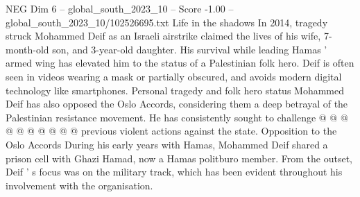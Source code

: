 \begin{textsample}{NEG Dim 6 – global\_south\_2023\_10 – Score -1.00 – global\_south\_2023\_10/102526695.txt}
Life in the shadows In 2014, tragedy struck Mohammed Deif as an Israeli airstrike claimed the lives of his wife, 7-month-old son, and 3-year-old daughter.
His survival while leading Hamas ' armed wing has elevated him to the status of a Palestinian folk hero.
Deif is often seen in videos wearing a mask or partially obscured, and avoids modern digital technology like smartphones.
Personal tragedy and folk hero status Mohammed Deif has also opposed the Oslo Accords, considering them a deep betrayal of the Palestinian resistance movement.
He has consistently sought to challenge @ @ @ @ @ @ @ @ @ @ previous violent actions against the state.
Opposition to the Oslo Accords During his early years with Hamas, Mohammed Deif shared a prison cell with Ghazi Hamad, now a Hamas politburo member.
From the outset, Deif ' s focus was on the military track, which has been evident throughout his involvement with the organisation.

\end{textsample}
